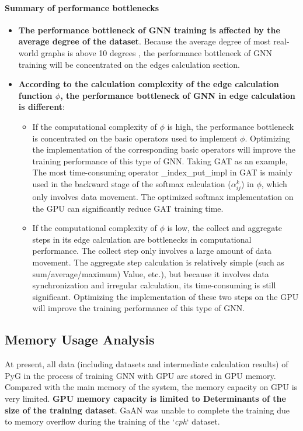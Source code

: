 \paragraph{Summary of performance bottlenecks}

\begin{itemize}
    \item \textbf{The performance bottleneck of GNN training is affected by the average degree of the dataset}. 
    Because the average degree of most real-world graphs is above 10 degrees \cite{network-repository}, 
    the performance bottleneck of GNN training will be concentrated on the edges calculation section.
    \item \textbf{According to the calculation complexity of the edge calculation function $\phi$, the performance bottleneck of GNN in edge calculation is different}:
    \begin{itemize}
        \item If the computational complexity of $\phi$ is high, the performance bottleneck is concentrated on the basic operators used to implement $\phi$.
        Optimizing the implementation of the corresponding basic operators will improve the training performance of this type of GNN.
        Taking GAT as an example, The most time-consuming operator \_index\_put\_impl in GAT is mainly used in the backward stage of the softmax calculation ($\alpha^k_{ij}$) in $\phi$,
        which only involves data movement.
        The optimized softmax implementation on the GPU can significantly reduce GAT training time.
        \item If the computational complexity of $\phi$ is low, the collect and aggregate steps in its edge calculation are bottlenecks in computational performance. The collect step only involves a large amount of data movement. The aggregate step calculation is relatively simple (such as sum/average/maximum) Value, etc.), but because it involves data synchronization and irregular calculation, its time-consuming is still significant.
         Optimizing the implementation of these two steps on the GPU will improve the training performance of this type of GNN.
    \end{itemize}
\end{itemize}


\subsection{Memory Usage Analysis}

At present, all data (including datasets and intermediate calculation results) of PyG in the process of training GNN with GPU
are stored in GPU memory. Compared with the main memory of the system, the memory capacity on GPU is very limited.
\textbf{GPU memory capacity is limited to Determinants of the size of the training dataset}. 
GaAN was unable to complete the training due to memory overflow during the training of the `\textit{cph}` dataset.

